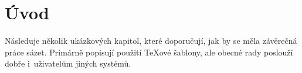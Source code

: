 \chapter*{Úvod}

Následuje několik ukázkových kapitol, které doporučují, jak by se
měla závěrečná práce sázet. Primárně popisují použití \TeX{}ové
šablony, ale obecné rady poslouží dobře i~uživatelům jiných
systémů.
